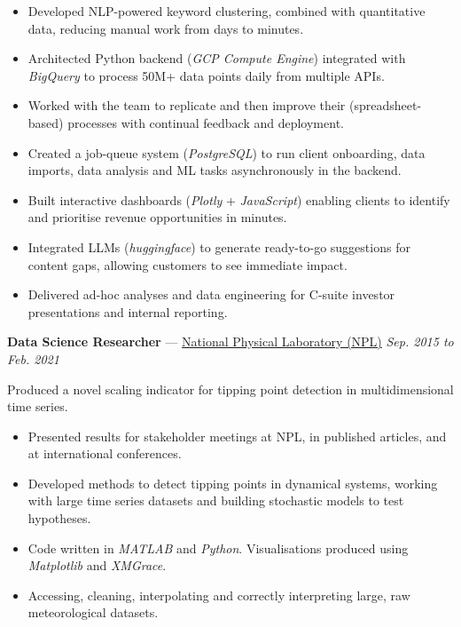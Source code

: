 \documentclass[10pt]{article}
\newenvironment{innerlist}[1][\enskip\textbullet]{
	\begin{itemize}[#1,leftmargin=*,rightmargin=30pt,parsep=0pt,itemsep=1pt,topsep=2pt,partopsep=0pt]
}{\end{itemize}}
\begin{document}
\vspace{-6pt}

\begin{innerlist}
	\item Developed NLP-powered keyword clustering, combined with quantitative data, reducing manual work from days to minutes.
	\item Architected Python backend (\textit{GCP Compute Engine}) integrated with \textit{BigQuery} to process 50M+ data points daily from multiple APIs.
	\item Worked with the team to replicate and then improve their (spreadsheet-based) processes with continual feedback and deployment.
	\item Created a job-queue system (\textit{PostgreSQL}) to run client onboarding, data imports, data analysis and ML tasks asynchronously in the backend.
	\item Built interactive dashboards (\textit{Plotly} + \textit{JavaScript}) enabling clients to identify and prioritise revenue opportunities in minutes.
	\item Integrated LLMs (\textit{huggingface}) to generate ready-to-go suggestions for content gaps, allowing customers to see immediate impact. 
	\item Delivered ad-hoc analyses and data engineering for C-suite investor presentations and internal reporting.
\end{innerlist}

\vspace{14pt}
\textbf{Data Science Researcher} — \href{http://www.npl.co.uk}{National Physical Laboratory (NPL)} \hfill \emph{Sep. 2015 to Feb. 2021} \\

\vspace{-6pt}

Produced a novel scaling indicator for tipping point detection in multidimensional time series.\\

\vspace{-6pt}

\begin{innerlist}
	\item Presented results for stakeholder meetings at NPL, in published articles, and at international conferences. 
	\item Developed methods to detect tipping points in dynamical systems, working with large time series datasets and building stochastic models to test hypotheses. 
	\item Code written in \textit{MATLAB} and \textit{Python}. Visualisations produced using \textit{Matplotlib} and \textit{XMGrace}.
	\item Accessing, cleaning, interpolating and correctly interpreting large, raw meteorological datasets.
\end{innerlist}
\end{document}

